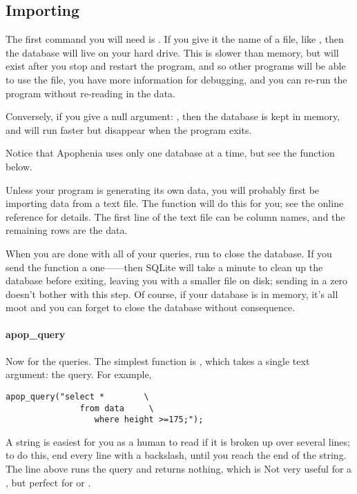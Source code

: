 \subsection{Importing}
The first command you will need is . If you give
it the name of a file, like , then the
database will live on your hard drive. This is slower than memory, but
will exist after you stop and restart the program, and so other programs
will be able to use the file, you have more information for debugging,
and you can re-run the program without re-reading in the data.

Conversely, if you give a null argument: ,
then the database is kept in memory, and will run faster but 
disappear when the program exits.

Notice that Apophenia uses only one database at a time, but
see the  function below.

Unless your program is generating its own data, you will probably
first be importing data from a text file.  The 
function will do this for you; see the online reference for details. The
first line of the text file can be column names, and the remaining rows
are the data. 

When you are done with all of your queries, run
 to close the database. If you send the function a
one------then SQLite will take a minute to clean
up the database before exiting, leaving you with a smaller file on disk;
sending in a zero doesn't bother with this step. Of course, if your
database is in memory, it's all moot and you can forget to close the
database without consequence.


\paragraph{apop\_query} Now for the queries. The simplest function
is , which takes a single text argument: the
query. For example,
\setc {}
\begin{lstlisting}
apop_query("select *        \
               from data     \
                  where height >=175;");
\end{lstlisting}

A string is easiest for you as a human to read if it is
broken up over several lines; to do this, end every line with a
backslash, until you reach the end of the string. The line above runs
the query and returns nothing, which is Not very useful for a , but perfect for
\sinline{create} or \sinline{insert}.

